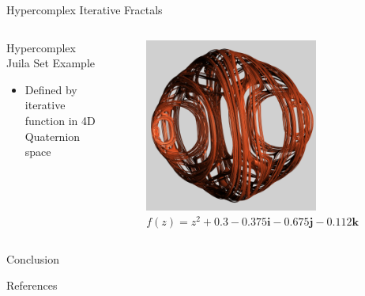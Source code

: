 \documentclass[aspectratio=169,t]{beamer}
\begin{document}
\begin{frame}[label={sec:orga4d6b64}]{Hypercomplex Iterative Fractals}
\begin{columns}
\begin{column}{0.55\columnwidth}
\begin{block}{Hypercomplex Juila Set Example}
\begin{itemize}
\item Defined by iterative function in 4D Quaternion space
\end{itemize}
\end{block}
\end{column}

\begin{column}{0.45\columnwidth}
\begin{figure}[htbp]
\centering
\includegraphics[width=0.75\textwidth]{./Figs/Fig_1v2.png}
\caption{\(f(z) = z^2 + 0.3 - 0.375\symbf{i} - 0.675\symbf{j} - 0.112\symbf{k}\)}
\end{figure}
\end{column}
\end{columns}
\end{frame}

\begin{frame}[label={sec:org4bdb8a3}]{Conclusion}
\setcounter{tocdepth}{2}
\tableofcontents
\end{frame}

\begin{frame}[allowframebreaks,label=]{References}
\nocite{*}


\end{frame}
\end{document}
